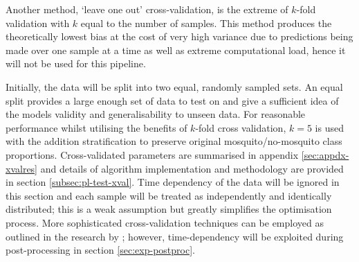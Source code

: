         Another method, `leave one out' cross-validation, is the extreme of $k$-fold validation with $k$ equal to the number of samples. This method produces the theoretically lowest bias at the cost of very high variance due to predictions being made over one sample at a time as well as extreme computational load, hence it will not be used for this pipeline.

        Initially, the data will be split into two equal, randomly sampled sets. An equal split provides a large enough set of data to test on and give a sufficient idea of the models validity and generalisability to unseen data. For reasonable performance whilst utilising the benefits of $k$-fold cross validation, $k=5$ is used with the addition stratification to preserve original mosquito/no-mosquito class proportions. Cross-validated parameters are summarised in appendix \ref{sec:appdx-xvalres} and details of algorithm implementation and methodology are provided in section \ref{subsec:pl-test-xval}. Time dependency of the data will be ignored in this section and each sample will be treated as independently and identically distributed; this is a weak assumption but greatly simplifies the optimisation process. More sophisticated cross-validation techniques can be employed as outlined in the research by \textcite{Yang2001}; however, time-dependency will be exploited during post-processing in section \ref{sec:exp-postproc}.
        
        
    
        
     
         
  
    
        
